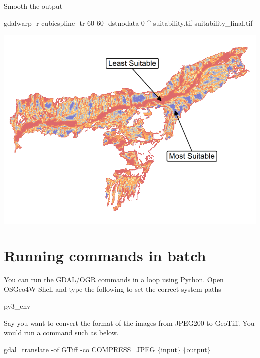\documentclass[12pt,a4paper]{article}
\newenvironment{Shaded}{\begin{snugshade}}{\end{snugshade}}
\newcommand{\DataTypeTok}[1]{\textcolor[rgb]{0.13,0.29,0.53}{#1}}
\newcommand{\ExtensionTok}[1]{#1}
\newcommand{\NormalTok}[1]{#1}
\begin{document}
Smooth the output

\begin{Shaded}
\begin{Highlighting}[]
\ExtensionTok{gdalwarp}\NormalTok{ -r cubicspline -tr 60 60 -dstnodata 0 ^}
  \ExtensionTok{suitability.tif}\NormalTok{ suitability_final.tif}
\end{Highlighting}
\end{Shaded}

\begin{center}\includegraphics{images/gdal/suitability} \end{center}

\hypertarget{running-commands-in-batch}{%
\section{Running commands in batch}\label{running-commands-in-batch}}

You can run the GDAL/OGR commands in a loop using Python. Open OSGeo4W
Shell and type the following to set the correct system paths

\begin{Shaded}
\begin{Highlighting}[]
\ExtensionTok{py3_env}
\end{Highlighting}
\end{Shaded}

Say you want to convert the format of the images from JPEG200 to
GeoTiff. You would run a command such as below.

\begin{Shaded}
\begin{Highlighting}[]
\ExtensionTok{gdal_translate}\NormalTok{ -of GTiff -co COMPRESS=JPEG }\DataTypeTok{\{input\}} \DataTypeTok{\{output\}}
\end{Highlighting}
\end{Shaded}
\end{document}
